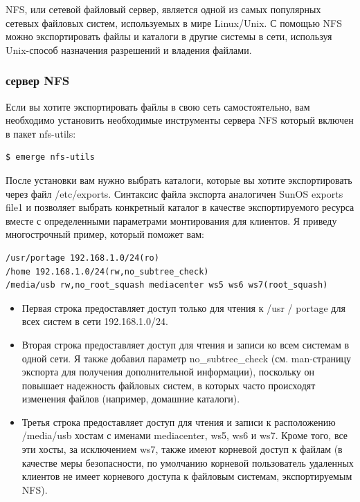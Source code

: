 \documentclass[10pt]{book}
\begin{document}
NFS, или сетевой файловый сервер, является одной из самых популярных сетевых файловых систем, используемых в мире Linux/Unix. С помощью NFS можно экспортировать файлы и каталоги в другие системы в сети, используя Unix-способ назначения разрешений и владения файлами.

\subsubsection{сервер NFS}

Если вы хотите экспортировать файлы в свою сеть самостоятельно, вам необходимо установить необходимые инструменты сервера NFS
который включен в пакет nfs-utils:

\begin{tcolorbox} 
\begin{lstlisting}
$ emerge nfs-utils
\end{lstlisting}
\end{tcolorbox}

После установки вам нужно выбрать каталоги, которые вы хотите экспортировать через файл /etc/exports. Синтаксис файла экспорта аналогичен SunOS exports file1 и позволяет выбрать конкретный каталог в качестве экспортируемого ресурса вместе с определенными параметрами монтирования для клиентов. Я приведу многострочный пример, который поможет вам:

\begin{tcolorbox} 
\begin{lstlisting}
/usr/portage 192.168.1.0/24(ro)
/home 192.168.1.0/24(rw,no_subtree_check)
/media/usb rw,no_root_squash mediacenter ws5 ws6 ws7(root_squash)
\end{lstlisting}
\end{tcolorbox}

\begin{itemize}
\item Первая строка предоставляет доступ только для чтения к /usr / portage для всех систем в сети 192.168.1.0/24.
\item Вторая строка предоставляет доступ для чтения и записи ко всем системам в одной сети. Я также добавил параметр no\_subtree\_check (см. man-страницу экспорта для получения дополнительной информации), поскольку он повышает надежность файловых систем, в которых часто происходят изменения файлов (например, домашние каталоги).
\item Третья строка предоставляет доступ для чтения и записи к расположению /media/usb хостам с именами mediacenter, ws5, ws6 и ws7. Кроме того, все эти хосты, за исключением ws7, также имеют корневой доступ к файлам (в качестве меры безопасности, по умолчанию корневой пользователь удаленных клиентов не имеет корневого доступа к файловым системам, экспортируемым NFS).
\end{itemize}
\end{document}
